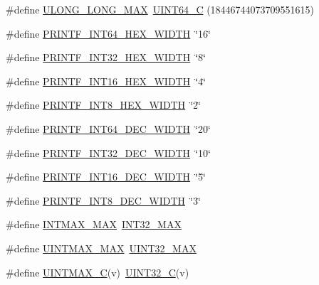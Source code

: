 \begin{DoxyCompactItemize}
\item 
\#define \hyperlink{orstdint_8h_a37ae7009688ff03a821794e036e3e458}{U\-L\-O\-N\-G\-\_\-\-L\-O\-N\-G\-\_\-\-M\-A\-X}~\hyperlink{stdint_8h_a134ae84400d184ed2570e3270d5472c2}{U\-I\-N\-T64\-\_\-\-C} (18446744073709551615)
\item 
\#define \hyperlink{orstdint_8h_a6b45386978db7d05efc9c5ce140ba27c}{P\-R\-I\-N\-T\-F\-\_\-\-I\-N\-T64\-\_\-\-H\-E\-X\-\_\-\-W\-I\-D\-T\-H}~\char`\"{}16\char`\"{}
\item 
\#define \hyperlink{orstdint_8h_ae6f04461e1801eefd3b64f3b851abed8}{P\-R\-I\-N\-T\-F\-\_\-\-I\-N\-T32\-\_\-\-H\-E\-X\-\_\-\-W\-I\-D\-T\-H}~\char`\"{}8\char`\"{}
\item 
\#define \hyperlink{orstdint_8h_ab330e7280ae15049599408e99c73273b}{P\-R\-I\-N\-T\-F\-\_\-\-I\-N\-T16\-\_\-\-H\-E\-X\-\_\-\-W\-I\-D\-T\-H}~\char`\"{}4\char`\"{}
\item 
\#define \hyperlink{orstdint_8h_a32f0dce3fbd74aeeb4398ebc25abde7d}{P\-R\-I\-N\-T\-F\-\_\-\-I\-N\-T8\-\_\-\-H\-E\-X\-\_\-\-W\-I\-D\-T\-H}~\char`\"{}2\char`\"{}
\item 
\#define \hyperlink{orstdint_8h_a9d70c86cd8202228d85db7aeed22497b}{P\-R\-I\-N\-T\-F\-\_\-\-I\-N\-T64\-\_\-\-D\-E\-C\-\_\-\-W\-I\-D\-T\-H}~\char`\"{}20\char`\"{}
\item 
\#define \hyperlink{orstdint_8h_aa7207fcbdc05d7cf877066028543c28b}{P\-R\-I\-N\-T\-F\-\_\-\-I\-N\-T32\-\_\-\-D\-E\-C\-\_\-\-W\-I\-D\-T\-H}~\char`\"{}10\char`\"{}
\item 
\#define \hyperlink{orstdint_8h_ac1bfd0b6e49224d67657fe9e7502623c}{P\-R\-I\-N\-T\-F\-\_\-\-I\-N\-T16\-\_\-\-D\-E\-C\-\_\-\-W\-I\-D\-T\-H}~\char`\"{}5\char`\"{}
\item 
\#define \hyperlink{orstdint_8h_a9b86583004a9dce380fe84b16de763b6}{P\-R\-I\-N\-T\-F\-\_\-\-I\-N\-T8\-\_\-\-D\-E\-C\-\_\-\-W\-I\-D\-T\-H}~\char`\"{}3\char`\"{}
\item 
\#define \hyperlink{orstdint_8h_a022b9b0a3564d786244a4631847c37a3}{I\-N\-T\-M\-A\-X\-\_\-\-M\-A\-X}~\hyperlink{stdint_8h_a181807730d4a375f848ba139813ce04f}{I\-N\-T32\-\_\-\-M\-A\-X}
\item 
\#define \hyperlink{orstdint_8h_aa54fd5210434219e9027bfa0f0e325c8}{U\-I\-N\-T\-M\-A\-X\-\_\-\-M\-A\-X}~\hyperlink{stdint_8h_ab5eb23180f7cc12b7d6c04a8ec067fdd}{U\-I\-N\-T32\-\_\-\-M\-A\-X}
\item 
\#define \hyperlink{orstdint_8h_a572bc4e8e4eae73a2e1e6a158d3837a4}{U\-I\-N\-T\-M\-A\-X\-\_\-\-C}(v)~\hyperlink{stdint_8h_a2451a7ede7ebd810357f1503e9898ea6}{U\-I\-N\-T32\-\_\-\-C}(v)

\end{DoxyCompactItemize}
